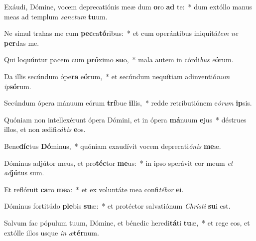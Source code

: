 \item Exáudi, Dómine, vocem deprecatiónis meæ dum \textbf{o}ro \textbf{ad} te:~* dum extóllo manus meas ad templum \textit{sanc}\textit{tum} \textbf{tu}um.
\item Ne simul trahas me cum \textbf{pec}ca\textbf{tó}ribus:~* et cum operántibus iniquitá\textit{tem} \textit{ne} \textbf{per}das me.
\item Qui loquúntur pacem cum \textbf{pró}ximo \textbf{su}o,~* mala autem in córdi\textit{bus} \textit{e}\textbf{ó}rum.
\item Da illis secúndum ópe\textbf{ra} e\textbf{ó}rum,~* et secúndum nequítiam adinventió\textit{num} \textit{ip}\textbf{só}rum.
\item Secúndum ópera mánuum eórum \textbf{trí}bue \textbf{il}lis,~* redde retributiónem e\textit{ó}\textit{rum} \textbf{ip}sis.
\item Quóniam non intellexérunt ópera Dómini, et in ópera \textbf{má}nuum \textbf{e}jus~* déstrues illos, et non ædifi\textit{cá}\textit{bis} \textbf{e}os.
\item Bene\textbf{díc}tus \textbf{Dó}minus,~* quóniam exaudívit vocem deprecati\textit{ó}\textit{nis} \textbf{me}æ.
\item Dóminus adjútor meus, et pro\textbf{téc}tor \textbf{me}us:~* in ipso sperávit cor meum \textit{et} \textit{ad}\textbf{jú}tus sum.
\item Et reflóruit \textbf{ca}ro \textbf{me}a:~* et ex voluntáte mea confi\textit{té}\textit{bor} \textbf{e}i.
\item Dóminus fortitúdo \textbf{ple}bis \textbf{su}æ:~* et protéctor salvatiónum \textit{Chris}\textit{ti} \textbf{su}i est.
\item Salvum fac pópulum tuum, Dómine, et bénedic heredi\textbf{tá}ti \textbf{tu}æ,~* et rege eos, et extólle illos usque \textit{in} \textit{æ}\textbf{tér}num.
